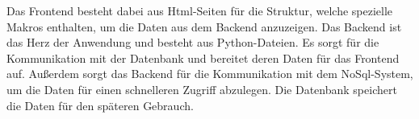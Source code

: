 Das Frontend besteht dabei aus Html-Seiten für die Struktur, welche spezielle
Makros enthalten, um die Daten aus dem Backend anzuzeigen. Das Backend ist das
Herz der Anwendung und besteht aus Python-Dateien. Es sorgt für die
Kommunikation mit der Datenbank und bereitet deren Daten für das Frontend auf.
Außerdem sorgt das Backend für die Kommunikation mit dem NoSql-System, um die
Daten für einen schnelleren Zugriff abzulegen. Die Datenbank speichert die Daten
für den späteren Gebrauch.
